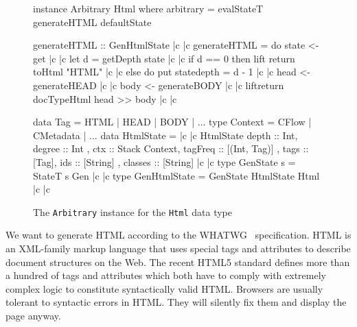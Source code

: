\begin{figure}[!t]
  \centering
  \begin{haskell}
instance Arbitrary Html where
  arbitrary = evalStateT generateHTML defaultState

generateHTML :: GenHtmlState |c \label{ref.generateHTML.begin} |c
generateHTML = do
  state <- get |c \label{ref.generateHTML.getState} |c
  let d = getDepth state |c \label{ref.generateHTML.getDepth} |c
  if d == 0
  then lift \dollar return \dollar toHtml "HTML" |c \label{ref.generateHTML.returnString} |c
  else do put state{depth = d - 1} |c \label{ref.generateHTML.updateState} |c
           head <- generateHEAD |c \label{ref.generateHTML.newHead} |c
           body <- generateBODY |c \label{ref.generateHTML.newBody} |c
           lift\dollar return \dollar docTypeHtml \dollar head >> body |c \label{ref.generateHTML.end} |c

data Tag = HTML | HEAD | BODY | ...
type Context = CFlow | CMetadata | ...
data HtmlState = |c \label{ref.HtmlState.begin} |c
  HtmlState { depth    :: Int,           degree  :: Int
             , ctx     :: Stack Context, tagFreq :: [(Int, Tag)]
             , tags    :: [Tag],         ids     :: [String]
             , classes :: [String] } |c \label{ref.HtmlState.end} |c
type GenState s = StateT s Gen |c \label{ref.GenState} |c
type GenHtmlState = GenState HtmlState Html |c \label{ref.GenHtmlState} |c
  \end{haskell}
  \caption{The \texttt{Arbitrary} instance for the \texttt{Html} data type}
  \label{fig.html.arb.def}
\end{figure}

We want to generate HTML according to the WHATWG~\cite{htmlspec} specification. HTML is an XML-family markup language that uses special tags and attributes to describe document structures on the Web. The recent HTML5 standard defines more than a hundred of tags and attributes which both have to comply with extremely complex logic to constitute  syntactically valid HTML. Browsers are usually tolerant to syntactic errors in HTML. They will silently fix them and display the page anyway.

